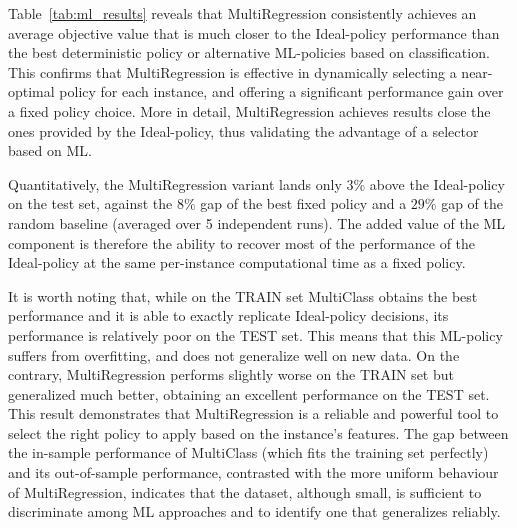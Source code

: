 \documentclass[preprint,11pt,authoryear]{elsarticle}
\begin{document}
Table~\ref{tab:ml_results} reveals that MultiRegression consistently achieves an average objective value that is much closer to the Ideal-policy performance than the best deterministic policy or alternative ML-policies based on classification. This confirms that MultiRegression is effective in dynamically selecting a near-optimal policy for each instance, and offering a significant performance gain over a fixed policy choice. More in detail, MultiRegression achieves results close the ones provided by the Ideal-policy, thus validating the advantage of a selector based on ML. 

Quantitatively, the MultiRegression variant lands only $3\%$ above the Ideal-policy on the test set, against the $8\%$ gap of the best fixed policy and a $29\%$ gap of the random baseline (averaged over 5 independent runs). The added value of the ML component is therefore the ability to recover most of the performance of the Ideal-policy at the same per-instance computational time as a fixed policy.

It is worth noting that, while on the TRAIN set MultiClass obtains the best performance and it is able to exactly replicate Ideal-policy decisions, its performance is relatively poor on the TEST set. This means that this ML-policy suffers from overfitting, and does not generalize well on new data. On the contrary, MultiRegression performs slightly worse on the TRAIN set but generalized much better, obtaining an excellent performance on the TEST set. This result demonstrates that MultiRegression is a reliable and powerful tool to select 
the right policy to apply based on the instance's features. The gap between the in-sample performance of MultiClass (which fits the training set perfectly) and its out-of-sample performance, contrasted with the more uniform behaviour of MultiRegression, indicates that the dataset, although small, is sufficient to discriminate among ML approaches and to identify one that generalizes reliably.
\end{document}
